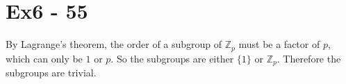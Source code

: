 \section*{Ex6 - 55}
By Lagrange's theorem, the order of a subgroup of $ \mathbb{Z}_p $ must be a factor of $ p $, which can only be $ 1 $ or $ p $. So the subgroups are either $ \{ 1 \} $ or $ \mathbb{Z}_p $. Therefore the subgroups are trivial.